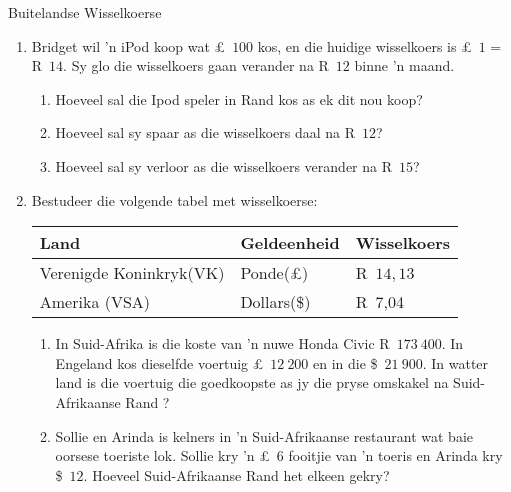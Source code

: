 \begin{exercises}{Buitelandse Wisselkoerse}
{
    \begin{enumerate}[label=\textbf{\arabic*}.]
	\item Bridget wil ’n iPod koop wat £~$100$ kos, en die huidige wisselkoers is £~$1$ = R~$14$. Sy glo die wisselkoers gaan verander na R~$12$ binne ’n maand.
	\begin{enumerate}
	    \item Hoeveel sal die Ipod speler in Rand kos as ek dit nou koop?
	    \item Hoeveel sal sy spaar as die wisselkoers daal na R~$12$?
	    \item Hoeveel sal sy verloor as die wisselkoers verander na R~$15$?
	\end{enumerate}

	\item Bestudeer die volgende tabel met wisselkoerse:
	\begin{center}
	    \begin{tabular}{ |l|l|l| }
		\hline
		Land	&	Geldeenheid 	&	Wisselkoers\\ \hline
		Verenigde Koninkryk(VK) 	&	Ponde(£)	&	R~$14,13$\\ \hline
		Amerika (VSA) 	&	Dollars(\$)	&	R~7,04\\ \hline
	    \end{tabular}
	\end{center}
	
	\begin{enumerate}
	    \item In Suid-Afrika is die koste van ’n nuwe Honda Civic R~$173~400$. In Engeland kos dieselfde voertuig £~$12~200$ en in die \$~$21~900$. In watter land is die voertuig die goedkoopste as jy die pryse omskakel na Suid-Afrikaanse Rand ?

	    \item Sollie en Arinda is kelners in ’n Suid-Afrikaanse restaurant wat baie oorsese toeriste lok. Sollie kry ’n £~$6$ fooitjie van ’n toeris en Arinda kry \$~$12$.  Hoeveel Suid-Afrikaanse Rand het elkeen gekry?
	\end{enumerate}
    \end{enumerate}

}
\end{exercises}



